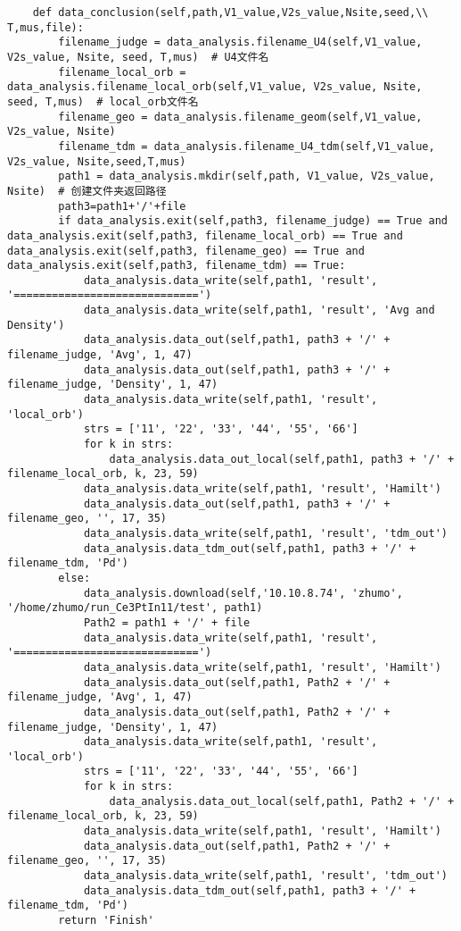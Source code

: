 \begin{description}
\begin{lstlisting}
    def data_conclusion(self,path,V1_value,V2s_value,Nsite,seed,\\ T,mus,file):
        filename_judge = data_analysis.filename_U4(self,V1_value, V2s_value, Nsite, seed, T,mus)  # U4文件名
        filename_local_orb = data_analysis.filename_local_orb(self,V1_value, V2s_value, Nsite, seed, T,mus)  # local_orb文件名
        filename_geo = data_analysis.filename_geom(self,V1_value, V2s_value, Nsite)
        filename_tdm = data_analysis.filename_U4_tdm(self,V1_value, V2s_value, Nsite,seed,T,mus)
        path1 = data_analysis.mkdir(self,path, V1_value, V2s_value, Nsite)  # 创建文件夹返回路径
        path3=path1+'/'+file
        if data_analysis.exit(self,path3, filename_judge) == True and data_analysis.exit(self,path3, filename_local_orb) == True and data_analysis.exit(self,path3, filename_geo) == True and data_analysis.exit(self,path3, filename_tdm) == True:
            data_analysis.data_write(self,path1, 'result', '=============================')
            data_analysis.data_write(self,path1, 'result', 'Avg and Density')
            data_analysis.data_out(self,path1, path3 + '/' + filename_judge, 'Avg', 1, 47)
            data_analysis.data_out(self,path1, path3 + '/' + filename_judge, 'Density', 1, 47)
            data_analysis.data_write(self,path1, 'result', 'local_orb')
            strs = ['11', '22', '33', '44', '55', '66']
            for k in strs:
                data_analysis.data_out_local(self,path1, path3 + '/' + filename_local_orb, k, 23, 59)
            data_analysis.data_write(self,path1, 'result', 'Hamilt')
            data_analysis.data_out(self,path1, path3 + '/' + filename_geo, '', 17, 35)
            data_analysis.data_write(self,path1, 'result', 'tdm_out')
            data_analysis.data_tdm_out(self,path1, path3 + '/' + filename_tdm, 'Pd')
        else:
            data_analysis.download(self,'10.10.8.74', 'zhumo', '/home/zhumo/run_Ce3PtIn11/test', path1)
            Path2 = path1 + '/' + file
            data_analysis.data_write(self,path1, 'result', '=============================')
            data_analysis.data_write(self,path1, 'result', 'Hamilt')
            data_analysis.data_out(self,path1, Path2 + '/' + filename_judge, 'Avg', 1, 47)
            data_analysis.data_out(self,path1, Path2 + '/' + filename_judge, 'Density', 1, 47)
            data_analysis.data_write(self,path1, 'result', 'local_orb')
            strs = ['11', '22', '33', '44', '55', '66']
            for k in strs:
                data_analysis.data_out_local(self,path1, Path2 + '/' + filename_local_orb, k, 23, 59)
            data_analysis.data_write(self,path1, 'result', 'Hamilt')
            data_analysis.data_out(self,path1, Path2 + '/' + filename_geo, '', 17, 35)
            data_analysis.data_write(self,path1, 'result', 'tdm_out')
            data_analysis.data_tdm_out(self,path1, path3 + '/' + filename_tdm, 'Pd')
        return 'Finish'


\end{lstlisting}
\end{description}
